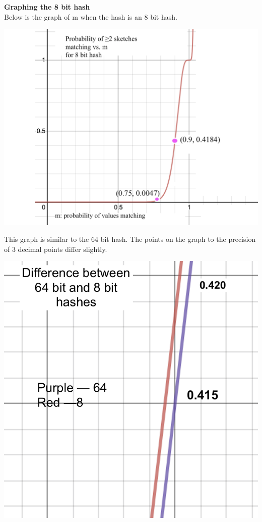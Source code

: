 \documentclass[11pt, solution, letterpaper]{format}
\begin{document}
\textbf{Graphing the 8 bit hash}\\
Below is the graph of m when the hash is an 8 bit hash.\\
\begin{center}\includegraphics[scale=.5]{8bit.png}\end{center}

This graph is similar to the 64 bit hash. The points on the graph to the precision of 3 decimal points differ slightly. \\
\begin{center}\includegraphics[scale=.5]{8-64bit.png}\end{center}
\end{document}
